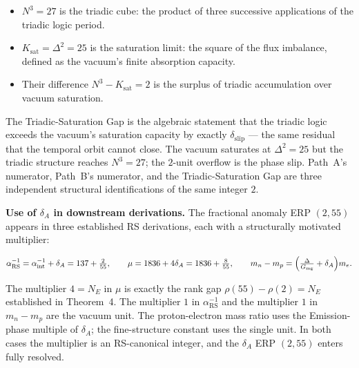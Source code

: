 \documentclass[11pt, letterpaper]{article}
\theoremstyle{definition}
\theoremstyle{plain}
\begin{document}
\begin{observebox}
\begin{itemize}
  \item $N^3 = 27$ is the triadic cube: the product of three successive applications
    of the triadic logic period.
  \item $K_\mathrm{sat} = \Delta^2 = 25$ is the saturation limit: the square of the
    flux imbalance, defined as the vacuum's finite absorption capacity.
  \item Their difference $N^3 - K_\mathrm{sat} = 2$ is the surplus of triadic
    accumulation over vacuum saturation.
\end{itemize}

The Triadic-Saturation Gap is the algebraic statement that the triadic logic
exceeds the vacuum's saturation capacity by exactly $\delta_\mathrm{slip}$ — the
same residual that the temporal orbit cannot close. The vacuum saturates at $\Delta^2
= 25$ but the triadic structure reaches $N^3 = 27$; the $2$-unit overflow is the
phase slip. Path~A's numerator, Path~B's numerator, and the Triadic-Saturation Gap
are three independent structural identifications of the same integer $2$.

\noindent\textbf{Use of $\delta_A$ in downstream derivations.}
The fractional anomaly ERP $(2, 55)$ appears in three established RS derivations,
each with a structurally motivated multiplier:

\[
\alpha^{-1}_\mathrm{RS} = \alpha^{-1}_\mathrm{int} + \delta_A = 137 + \tfrac{2}{55},
\qquad
\mu = 1836 + 4\delta_A = 1836 + \tfrac{8}{55},
\qquad
m_n - m_p = \Bigl(\tfrac{\Delta}{G_\mathrm{mg}} + \delta_A\Bigr) m_e.
\]

The multiplier $4 = N_E$ in $\mu$ is exactly the rank gap $\rho(55) - \rho(2) = N_E$
established in Theorem~4. The multiplier $1$ in $\alpha^{-1}_\mathrm{RS}$ and the
multiplier $1$ in $m_n - m_p$ are the vacuum unit. The proton-electron mass ratio
uses the Emission-phase multiple of $\delta_A$; the fine-structure constant uses the
single unit. In both cases the multiplier is an RS-canonical integer, and the
$\delta_A$ ERP $(2, 55)$ enters fully resolved.
\end{observebox}
\end{document}

